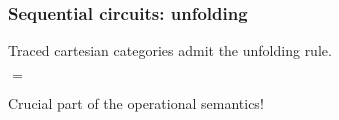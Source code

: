 \begin{frame}
    \frametitle{Sequential circuits: unfolding}

    \pause

    Traced cartesian categories admit the \alert{unfolding} rule.

    \pause
    \vspace{1em}

    \begin{center}
        \pause
        \quad$=$\quad
    \end{center}

    \pause

    Crucial part of the operational semantics!
\end{frame}